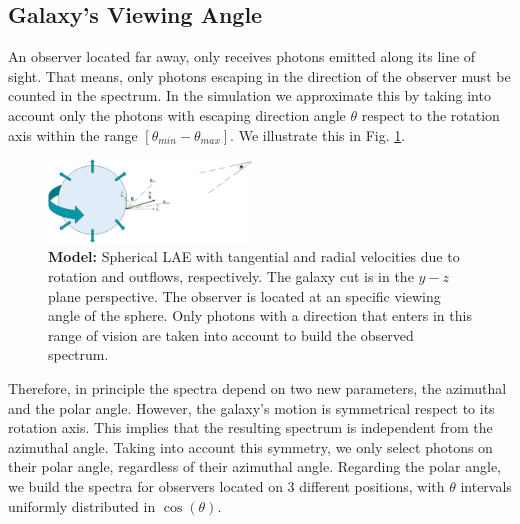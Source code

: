 \documentclass[twocolappendix]{latex/emulateapj}
\begin{document}

\subsection{Galaxy's Viewing Angle}
An observer located far away, only receives photons emitted along its line of sight. That means, only photons escaping in the direction of the observer must be counted in the spectrum. In the simulation we approximate this by taking into account only the photons with escaping direction angle $\theta$ respect to the rotation axis within the range $[\theta_{min}-\theta_{max}]$. We illustrate this in Fig. \ref{fig:model}. \\

\begin{figure}[h!]
	\begin{center}
		\includegraphics[width=0.48\textwidth]{./figures/model}
	\end{center}
	\caption{\textbf{Model:} Spherical LAE with tangential and radial velocities due to rotation and outflows, respectively. The galaxy cut is in the $y-z$ plane perspective. The observer is located at an specific viewing angle of the sphere. Only photons with a direction that enters in this range of vision are taken into account to build the observed spectrum.
		\label{fig:model}}
\end{figure}

Therefore, in principle the spectra depend on two new parameters, the azimuthal and the polar angle. However, the galaxy's motion is symmetrical respect to its rotation axis. This implies that the resulting spectrum is independent from the azimuthal angle. Taking into account this symmetry, we only select photons on their polar angle, regardless of their azimuthal angle. Regarding the polar angle, we build the spectra for observers located on 3 different positions, with $\theta$ intervals uniformly distributed in $\cos(\theta)$. \\ 
\end{document}
